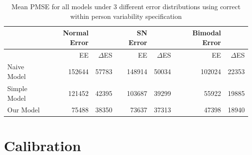\documentclass[11pt]{article}\usepackage[]{graphicx}\usepackage[]{color}
\begin{document}
%   
% 
% 

\begin{table}[ht]
\centering
\begin{tabular}{l|rr|rr|rr}
  \hline
 & Normal Error & & SN Error & & Bimodal Error & \\ 
  \hline
  & EE & $\Delta$ES & EE & $\Delta$ES & EE & $\Delta$ES \\
  \hline
  Naive Model & 152644 & 57783 & 148914 & 50034 & 102024 & 22353 \\
  Simple Model & 121452  & 42395 & 103687 & 39299 & 55922 & 19885 \\
  Our Model & 75488 & 38350 & 73637 & 37313 & 47398 & 18940 \\
   \hline
\end{tabular}
\caption{Mean PMSE for all models under 3 different error distributions using correct within person variability specification}
\label{pmse2}
\end{table}


\section{Calibration}
\end{document}
